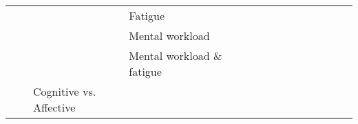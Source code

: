 \begin{tabular}{p{1.5cm}p{1.5cm}p{1.5cm}p{1.5cm}p{0.6cm}p{0.6cm}p{0.6cm}p{0.6cm}p{0.6cm}p{0.6cm}p{0.6cm}p{0.6cm}p{0.6cm}p{0.6cm}p{0.6cm}}
                                &                 &                   & Fatigue &                                                             &                                                                                                      \cite{Hajinoroozi2016} &                                                                        &                  &                                      &                                                            &                      &                       &                                 &                         &                                                                      \\
                                &                 &                   & Mental workload &                                   \cite{Yin2017a, Yin2016b} &                                                                                              \cite{Almogbel2018, Zhang2017} &                                          \cite{Hefron2018, Kuanar2018} &                  &                                      &                                                            &                      &                       &                                 &                         &                                                    \cite{Hefron2017} \\
                                &                 &                   & Mental workload \& fatigue &                                                             &                                                                                                                             &                                                                        &                  &                       \cite{Yin2017} &                                                            &                      &                       &                                 &                         &                                                                      \\
                                &                 & Cognitive vs. Affective &   &                                                             &                                                                                                                             &                                                                        &                  &                 \cite{Bashivan2016b} &                                                            &                      &                       &                                 &                         &                                                                      \\

\end{tabular}
